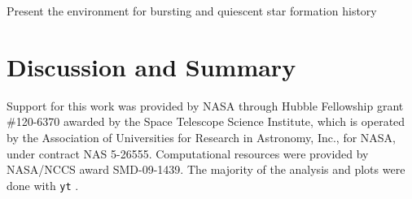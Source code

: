 \documentclass[apjl]{emulateapj}
\begin{document}
\li Present the environment for bursting and quiescent star formation
history

\section{Discussion and Summary}

\acknowledgments

Support for this work was provided by NASA through Hubble Fellowship
grant \#120-6370 awarded by the Space Telescope Science Institute,
which is operated by the Association of Universities for Research in
Astronomy, Inc., for NASA, under contract NAS 5-26555.  Computational
resources were provided by NASA/NCCS award SMD-09-1439.  The majority
of the analysis and plots were done with \texttt{yt}
\citep{yt_full_paper}.

%

\end{document}
